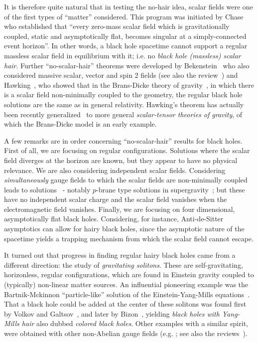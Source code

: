 It is therefore quite natural that in testing the no-hair idea, scalar fields were one of the first types of ``matter'' considered.
This program was initiated by Chase~\cite{Chase:1970wq} who established that ``every zero-mass scalar field which is gravitationally coupled, static and asymptotically flat, becomes singular at a simply-connected event horizon''.
In other words, a black hole spacetime cannot support a regular massless scalar field in equilibrium with it; i.e. no \textit{black hole (massless) scalar hair}.
Further ``no-scalar-hair'' theorems were developed by Bekenstein~\cite{Bekenstein:1971hc,Bekenstein:1972ky} who also considered massive scalar, vector and spin 2 fields (see also the review~\cite{Bekenstein:1996pn}) and Hawking~\cite{Hawking:1972qk}, who showed that in the Brans-Dicke theory of gravity~\cite{Brans:1961sx}, in which there is a scalar field non-minimally coupled to the geometry, the regular black hole solutions are the same as in general relativity.
Hawking's theorem has actually been recently generalized~\cite{Sotiriou:2011dz} to more general \textit{scalar-tensor theories of gravity}, of which the Brans-Dicke model is an early example.

A few remarks are in order concerning ``no-scalar-hair'' results for black holes.
First of all, we are focusing on regular configurations.
Solutions where the scalar field diverges at the horizon are known, but they appear to have no physical relevance.
We are also considering independent scalar fields.
Considering \textit{simultaneously} gauge fields to which the scalar fields are non-minimally coupled leads to solutions~\cite{Gibbons:1982ih,Gibbons:1987ps} - notably $p$-brane type solutions in supergravity~\cite{Horowitz:1991cd}; but these have no independent scalar charge and the scalar field vanishes when the electromagnetic field vanishes.
Finally, we are focusing on four dimensional, asymptotically flat black holes.
Considering, for instance, Anti-de-Sitter asymptotics can allow for hairy black holes, since the asymptotic nature of the spacetime yields a trapping mechanism from which the scalar field cannot escape. 

It turned out that progress in finding regular hairy black holes came from a different direction: the study of \textit{gravitating solitons}.
These are self-gravitating, horizonless, regular configurations, which are found in Einstein gravity coupled to (typically) non-linear matter sources.
An influential pioneering example was the Bartnik-Mckinnon ``particle-like'' solution of the Einstein-Yang-Mills equations~\cite{Bartnik:1988am}.
That a black hole could be added at the center of these solitons was found first by Volkov and Galtsov~\cite{Volkov:1989fi}, and later by Bizon~\cite{Bizon:1990sr}, yielding \textit{black holes with Yang-Mills hair} also dubbed \textit{colored black holes}.
Other examples with a similar spirit, were obtained with other non-Abelian gauge fields (e.g. \cite{Droz:1991cx,Lavrelashvili:1992cp}; see also the reviews~\cite{Bizon:1994dh,Volkov:1998cc}).

